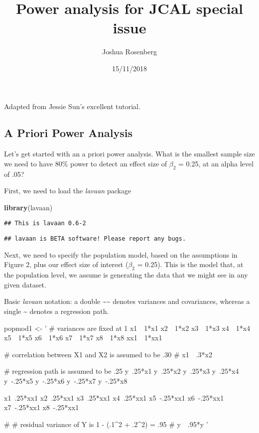 \documentclass[]{article}
\title{Power analysis for JCAL special issue}
\author{Joshua Rosenberg}
\date{15/11/2018}
\newenvironment{Shaded}{\begin{snugshade}}{\end{snugshade}}
\newcommand{\KeywordTok}[1]{\textcolor[rgb]{0.13,0.29,0.53}{\textbf{#1}}}
\newcommand{\StringTok}[1]{\textcolor[rgb]{0.31,0.60,0.02}{#1}}
\newcommand{\NormalTok}[1]{#1}
\begin{document}
\maketitle

Adapted from Jessie Sun's excellent tutorial.

\subsection{A Priori Power Analysis}\label{a-priori-power-analysis}

Let's get started with an a priori power analysis. What is the smallest
sample size we need to have 80\% power to detect an effect size of
\(\beta_2\) = 0.25, at an alpha level of .05?

First, we need to load the \emph{lavaan} package

\begin{Shaded}
\begin{Highlighting}[]
\KeywordTok{library}\NormalTok{(lavaan)}
\end{Highlighting}
\end{Shaded}

\begin{verbatim}
## This is lavaan 0.6-2
\end{verbatim}

\begin{verbatim}
## lavaan is BETA software! Please report any bugs.
\end{verbatim}

Next, we need to specify the population model, based on the assumptions
in Figure 2, plus our effect size of interest (\(\beta_2\) = 0.25). This
is the model that, at the population level, we assume is generating the
data that we might see in any given dataset.

Basic \emph{lavaan} notation: a double
\textasciitilde{}\textasciitilde{} denotes variances and covariances,
whereas a single \textasciitilde{} denotes a regression path.

\begin{Shaded}
\begin{Highlighting}[]
\NormalTok{popmod1 <-}\StringTok{ '}
\StringTok{# variances are fixed at 1}
\StringTok{x1~~1*x1}
\StringTok{x2~~1*x2}
\StringTok{x3~~1*x3}
\StringTok{x4~~1*x4}
\StringTok{x5~~1*x5}
\StringTok{x6~~1*x6}
\StringTok{x7~~1*x7}
\StringTok{x8~~1*x8}
\StringTok{xx1~~1*xx1}

\StringTok{# correlation between X1 and X2 is assumed to be .30}
\StringTok{# x1~~.3*x2}

\StringTok{# regression path is assumed to be .25}
\StringTok{y~.25*x1}
\StringTok{y~.25*x2}
\StringTok{y~.25*x3}
\StringTok{y~.25*x4}
\StringTok{y~-.25*x5}
\StringTok{y~-.25*x6}
\StringTok{y~-.25*x7}
\StringTok{y~-.25*x8}

\StringTok{x1~.25*xx1}
\StringTok{x2~.25*xx1}
\StringTok{x3~.25*xx1}
\StringTok{x4~.25*xx1}
\StringTok{x5~-.25*xx1}
\StringTok{x6~-.25*xx1}
\StringTok{x7~-.25*xx1}
\StringTok{x8~-.25*xx1}

\StringTok{# # residual variance of Y is 1 - (.1^2 + .2^2) = .95}
\StringTok{# y~~.95*y}
\StringTok{'}
\end{Highlighting}
\end{Shaded}
\end{document}
